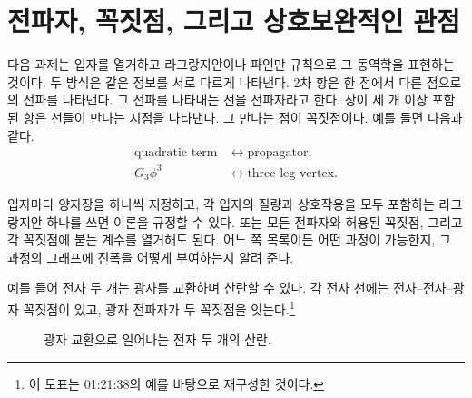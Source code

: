 \begin{classroomqa}
\end{classroomqa}

\section{전파자, 꼭짓점, 그리고 상호보완적인 관점}

다음 과제는 입자를 열거하고 라그랑지안이나 파인만 규칙으로 그 동역학을 표현하는 것이다. 두 방식은 같은 정보를 서로 다르게 나타낸다. 2차 항은 한 점에서 다른 점으로의 전파를 나타낸다. 그 전파를 나타내는 선을 전파자라고 한다. 장이 세 개 이상 포함된 항은 선들이 만나는 지점을 나타낸다. 그 만나는 점이 꼭짓점이다. 예를 들면 다음과 같다.
\begin{equation}
\begin{aligned}
\text{quadratic term}
&\longleftrightarrow \text{propagator},\\
G_3\phi^3
&\longleftrightarrow \text{three-leg vertex}.
\end{aligned}
\end{equation}

입자마다 양자장을 하나씩 지정하고, 각 입자의 질량과 상호작용을 모두 포함하는 라그랑지안 하나를 쓰면 이론을 규정할 수 있다. 또는 모든 전파자와 허용된 꼭짓점, 그리고 각 꼭짓점에 붙는 계수를 열거해도 된다. 어느 쪽 목록이든 어떤 과정이 가능한지, 그 과정의 그래프에 진폭을 어떻게 부여하는지 알려 준다.

예를 들어 전자 두 개는 광자를 교환하며 산란할 수 있다. 각 전자 선에는 전자--전자--광자 꼭짓점이 있고, 광자 전파자가 두 꼭짓점을 잇는다.\footnote{이 도표는 01:21:38의 예를 바탕으로 재구성한 것이다.}

\begin{figure}[htbp]
\centering
{}
\caption{광자 교환으로 일어나는 전자 두 개의 산란.}
\end{figure}

